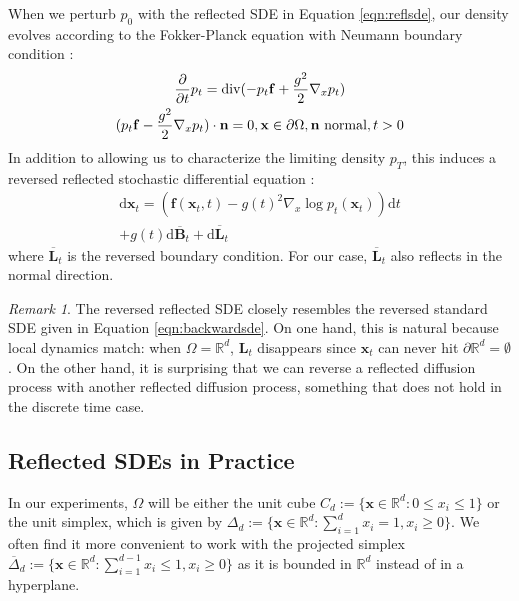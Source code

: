 \documentclass{article}
\theoremstyle{plain}
\theoremstyle{definition}
\theoremstyle{remark}
\newtheorem{remark}[theorem]{Remark}
\DeclareMathOperator{\ddiv}{div}
\newcommand{\R}{\mathbb{R}}
\newcommand{\grad}{\nabla}
\newcommand{\parderiv}[2]{\frac{\partial #1}{\partial #2}}
\renewcommand{\vec}{\mathbf}
\newcommand{\dd}{\mathrm{d}}
\begin{document}
When we perturb $p_0$ with the reflected SDE in Equation \ref{eqn:reflsde}, our density evolves according to the Fokker-Planck equation with Neumann boundary condition \citep{Schuss2013BrownianDA}:
\vspace{-1.5mm}
\begin{equation}\label{eqn:neumfp}
    \begin{gathered}
        \parderiv{}{t}p_t = \ddiv(- p_t\vec{f} + \frac{g^2}{2} \grad_x p_t)\\
        (p_t\vec{f} - \frac{g^2}{2} \grad_x p_t) \cdot \vec{n} = 0, \vec{x} \in \partial \Omega, \vec{n} \text{ normal}, t > 0
    \end{gathered}
    \vspace{-1mm}
\end{equation}
In addition to allowing us to characterize the limiting density $p_T$, this induces a reversed reflected stochastic differential equation \citep{Cattiaux1988TimeRO, Williams1988OnTO}:
\begin{equation}\label{eqn:reversereflsde}
    \begin{gathered}
        \dd\vec{x}_t = (\vec{f}(\vec{x}_t, t) - g(t)^2 \grad_x \log p_t(\vec{x}_t)) \dd t\\
        + g(t) \dd \overline{\vec{B}}_t + \dd \overline{\vec{L}}_t
    \end{gathered}
\end{equation}
where $\overline{\vec{L}}_t$ is the reversed boundary condition. For our case, $\overline{\vec{L}}_t$ also reflects in the normal direction.
\begin{remark}
    The reversed reflected SDE closely resembles the reversed standard SDE given in Equation \ref{eqn:backwardsde}. On one hand, this is natural because local dynamics match: when $\Omega = \R^d$, $\vec{L}_t$ disappears since $\vec{x}_t$ can never hit $\partial \R^d = \emptyset$. On the other hand, it is surprising that we can reverse a reflected diffusion process with another reflected diffusion process, something that does not hold in the discrete time case.
\end{remark}

\subsection{Reflected SDEs in Practice}\label{sec:method:examples}

In our experiments, $\Omega$ will be either the unit cube $C_d := \{\vec{x} \in \R^d : 0 \le x_i \le 1\}$ or the unit simplex, which is given by $\Delta_d := \{\vec{x} \in \R^d: \sum_{i = 1}^d x_i = 1, x_i \ge 0\}$. We often find it more convenient to work with the projected simplex $\overline{\Delta}_d := \{\vec{x} \in \R^d: \sum_{i = 1}^{d - 1} x_i \le 1, x_i \ge 0\}$ as it is bounded in $\R^d$ instead of in a hyperplane.
\end{document}
